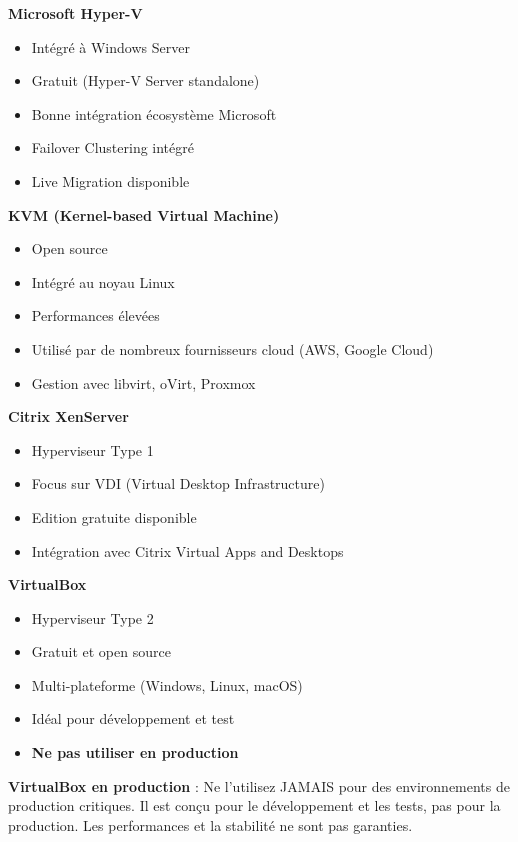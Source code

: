 \documentclass[11pt,a4paper]{article}
\begin{document}
\textbf{Microsoft Hyper-V}
\begin{itemize}
    \item Intégré à Windows Server
    \item Gratuit (Hyper-V Server standalone)
    \item Bonne intégration écosystème Microsoft
    \item Failover Clustering intégré
    \item Live Migration disponible
\end{itemize}

\textbf{KVM (Kernel-based Virtual Machine)}
\begin{itemize}
    \item Open source
    \item Intégré au noyau Linux
    \item Performances élevées
    \item Utilisé par de nombreux fournisseurs cloud (AWS, Google Cloud)
    \item Gestion avec libvirt, oVirt, Proxmox
\end{itemize}

\textbf{Citrix XenServer}
\begin{itemize}
    \item Hyperviseur Type 1
    \item Focus sur VDI (Virtual Desktop Infrastructure)
    \item Edition gratuite disponible
    \item Intégration avec Citrix Virtual Apps and Desktops
\end{itemize}

\textbf{VirtualBox}
\begin{itemize}
    \item Hyperviseur Type 2
    \item Gratuit et open source
    \item Multi-plateforme (Windows, Linux, macOS)
    \item Idéal pour développement et test
    \item \textbf{Ne pas utiliser en production}
\end{itemize}

\begin{dangerbox}
\textbf{VirtualBox en production} : Ne l'utilisez JAMAIS pour des environnements de production critiques. Il est conçu pour le développement et les tests, pas pour la production. Les performances et la stabilité ne sont pas garanties.
\end{dangerbox}
\end{document}
